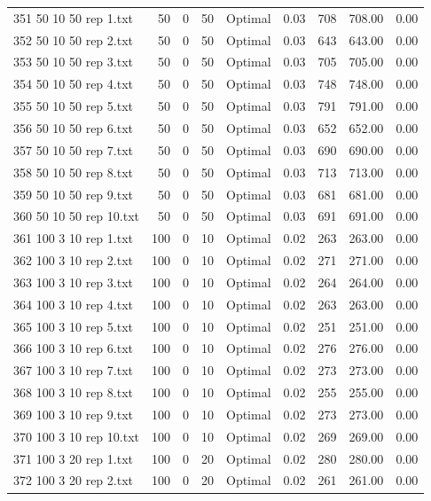 \begin{longtable}{lrrllrrrr}
351 50 10 50 rep 1.txt & 50 & 0 & 50 & Optimal &  0.03 & 708 & 708.00 &  0.00\\
352 50 10 50 rep 2.txt & 50 & 0 & 50 & Optimal &  0.03 & 643 & 643.00 &  0.00\\
353 50 10 50 rep 3.txt & 50 & 0 & 50 & Optimal &  0.03 & 705 & 705.00 &  0.00\\
354 50 10 50 rep 4.txt & 50 & 0 & 50 & Optimal &  0.03 & 748 & 748.00 &  0.00\\
355 50 10 50 rep 5.txt & 50 & 0 & 50 & Optimal &  0.03 & 791 & 791.00 &  0.00\\
356 50 10 50 rep 6.txt & 50 & 0 & 50 & Optimal &  0.03 & 652 & 652.00 &  0.00\\
357 50 10 50 rep 7.txt & 50 & 0 & 50 & Optimal &  0.03 & 690 & 690.00 &  0.00\\
358 50 10 50 rep 8.txt & 50 & 0 & 50 & Optimal &  0.03 & 713 & 713.00 &  0.00\\
359 50 10 50 rep 9.txt & 50 & 0 & 50 & Optimal &  0.03 & 681 & 681.00 &  0.00\\
360 50 10 50 rep 10.txt & 50 & 0 & 50 & Optimal &  0.03 & 691 & 691.00 &  0.00\\
361 100 3 10 rep 1.txt & 100 & 0 & 10 & Optimal &  0.02 & 263 & 263.00 &  0.00\\
362 100 3 10 rep 2.txt & 100 & 0 & 10 & Optimal &  0.02 & 271 & 271.00 &  0.00\\
363 100 3 10 rep 3.txt & 100 & 0 & 10 & Optimal &  0.02 & 264 & 264.00 &  0.00\\
364 100 3 10 rep 4.txt & 100 & 0 & 10 & Optimal &  0.02 & 263 & 263.00 &  0.00\\
365 100 3 10 rep 5.txt & 100 & 0 & 10 & Optimal &  0.02 & 251 & 251.00 &  0.00\\
366 100 3 10 rep 6.txt & 100 & 0 & 10 & Optimal &  0.02 & 276 & 276.00 &  0.00\\
367 100 3 10 rep 7.txt & 100 & 0 & 10 & Optimal &  0.02 & 273 & 273.00 &  0.00\\
368 100 3 10 rep 8.txt & 100 & 0 & 10 & Optimal &  0.02 & 255 & 255.00 &  0.00\\
369 100 3 10 rep 9.txt & 100 & 0 & 10 & Optimal &  0.02 & 273 & 273.00 &  0.00\\
370 100 3 10 rep 10.txt & 100 & 0 & 10 & Optimal &  0.02 & 269 & 269.00 &  0.00\\
371 100 3 20 rep 1.txt & 100 & 0 & 20 & Optimal &  0.02 & 280 & 280.00 &  0.00\\
372 100 3 20 rep 2.txt & 100 & 0 & 20 & Optimal &  0.02 & 261 & 261.00 &  0.00\\

\end{longtable}
